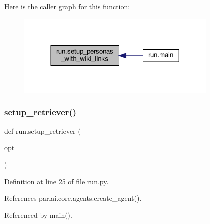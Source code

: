 Here is the caller graph for this function\+:
\nopagebreak
\begin{figure}[H]
\begin{center}
\leavevmode
\includegraphics[width=272pt]{namespacerun_a4f4e30a0127c995cc883fd747c4eea15_icgraph}
\end{center}
\end{figure}
\mbox{\label{namespacerun_af213d4a09b8048dcf1e76b0cb75dcace}} 
\subsubsection{\texorpdfstring{setup\+\_\+retriever()}{setup\_retriever()}}
{\footnotesize\ttfamily def run.\+setup\+\_\+retriever (\begin{DoxyParamCaption}\item[{}]{opt }\end{DoxyParamCaption})}



Definition at line 25 of file run.\+py.



References parlai.\+core.\+agents.\+create\+\_\+agent().



Referenced by main().

